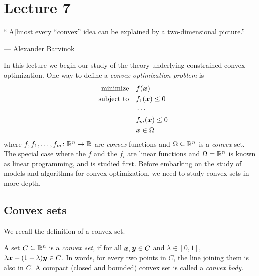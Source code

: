 %
%
% 


\chapter*{Lecture 7}
\setcounter{chapter}{7}
\setcounter{section}{0}
\setcounter{equation}{0}
\setcounter{theorem}{0}

\epigraph{``[A]lmost every ``convex'' idea can be explained by a two-dimensional picture.''}{--- \textup{Alexander Barvinok}}

In this lecture we begin our study of the theory underlying constrained convex optimization. One way to define a {\em convex optimization problem} is
\begin{align*}
\begin{split}
 \text{minimize}\quad & f(\bm{x})\\
 \quad\text{subject to}\quad & f_1(\bm{x})\leq 0\\
 & \cdots \\
 & f_m(\bm{x})\leq 0\\
 & \bm{x}\in \Omega
 \end{split}
\end{align*}
where $f,f_1,\dots,f_m\colon \mathbb{R}^n\to \mathbb{R}$ are {\em convex} functions and $\Omega\subseteq \mathbb{R}^n$ is a {\em convex} set. The special case where the $f$ and the $f_i$ are linear functions and $\Omega=\mathbb{R}^n$ is known as linear programming, and is studied first. Before embarking on the study of models and algorithms for convex optimization, we need to study convex sets in more depth.

\section{Convex sets}
We recall the definition of a convex set.
\begin{definition}
 A set $C\subseteq \mathbb{R}^n$ is a {\em convex set}, if for all $\bm{x},\bm{y}\in C$ and $\lambda\in [0,1]$, $\lambda\bm{x}+(1-\lambda)\bm{y}\in C$. In words, for every two points in $C$, the line joining them is also in $C$. A compact (closed and bounded) convex set is called a {\em convex body}.
\end{definition}

